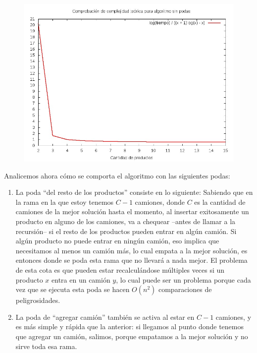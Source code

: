 \begin{figure}[H]
	\begin{minipage}[t]{\linewidth}
		\centering
		\includegraphics[width=\textwidth]{complejidad.jpg}
		\label{fig:p3_complejidad}
	\end{minipage}
\end{figure}

Analicemos ahora cómo se comporta el algoritmo con las siguientes podas: 
\begin{enumerate}
\item La poda ``del resto de los productos'' consiste en lo siguiente: Sabiendo que en la rama en la que estoy tenemos $C-1$ camiones, donde $C$ es la cantidad de camiones de la mejor solución hasta el momento, al insertar exitosamente un producto en alguno de los camiones, va a chequear --antes de llamar a la recursión-- si el resto de los productos pueden entrar en algún camión. Si algún producto no puede entrar en ningún camión, eso implica que necesitamos al menos un camión más, lo cual empata a la mejor solución, es entonces donde se poda esta rama que no llevará a nada mejor. El problema de esta cota es que pueden estar recalculándose múltiples veces si un producto $x$ entra en un camión $y$, lo cual puede ser un problema porque cada vez que se ejecuta esta poda se hacen $O(n^2)$ comparaciones de peligrosidades.
\item La poda de ``agregar camión'' también se activa al estar en $C-1$ camiones, y es más simple y rápida que la anterior: si llegamos al punto donde tenemos que agregar un camión, salimos, porque empatamos a la mejor solución y no sirve toda esa rama.
\end{enumerate}


